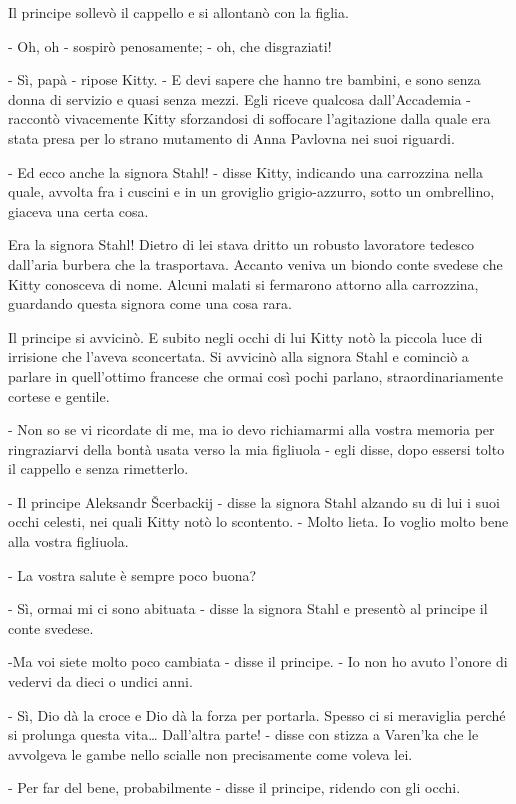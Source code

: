 Il principe sollevò il cappello e si allontanò con la figlia. 

- Oh, oh - sospirò penosamente; - oh, che disgraziati! 

- Sì, papà - ripose Kitty. - E devi sapere che hanno tre bambini, e sono senza donna di servizio e quasi senza mezzi. Egli riceve qualcosa dall'Accademia - raccontò vivacemente Kitty sforzandosi di soffocare l'agitazione dalla quale era stata presa per lo strano mutamento di Anna Pavlovna nei suoi riguardi. 

- Ed ecco anche la signora Stahl! - disse Kitty, indicando una carrozzina nella quale, avvolta fra i cuscini e in un groviglio grigio-azzurro, sotto un ombrellino, giaceva una certa cosa. 

Era la signora Stahl! Dietro di lei stava dritto un robusto lavoratore tedesco dall'aria burbera che la trasportava. Accanto veniva un biondo conte svedese che Kitty conosceva di nome. Alcuni malati si fermarono attorno alla carrozzina, guardando questa signora come una cosa rara. 

Il principe si avvicinò. E subito negli occhi di lui Kitty notò la piccola luce di irrisione che l'aveva sconcertata. Si avvicinò alla signora Stahl e cominciò a parlare in quell'ottimo francese che ormai così pochi parlano, straordinariamente cortese e gentile. 

- Non so se vi ricordate di me, ma io devo richiamarmi alla vostra memoria per ringraziarvi della bontà usata verso la mia figliuola - egli disse, dopo essersi tolto il cappello e senza rimetterlo. 

- Il principe Aleksandr Šcerbackij - disse la signora Stahl alzando su di lui i suoi occhi celesti, nei quali Kitty notò lo scontento. - Molto lieta. Io voglio molto bene alla vostra figliuola. 

- La vostra salute è sempre poco buona? 

- Sì, ormai mi ci sono abituata - disse la signora Stahl e presentò al principe il conte svedese. 

-Ma voi siete molto poco cambiata - disse il principe. - Io non ho avuto l'onore di vedervi da dieci o undici anni. 

- Sì, Dio dà la croce e Dio dà la forza per portarla. Spesso ci si meraviglia perché si prolunga questa vita\ldots{} Dall'altra parte! - disse con stizza a Varen'ka che le avvolgeva le gambe nello scialle non precisamente come voleva lei. 

- Per far del bene, probabilmente - disse il principe, ridendo con gli occhi. 

